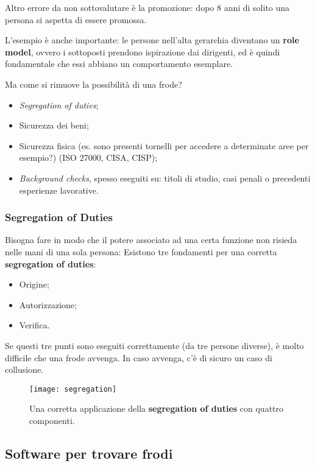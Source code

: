Altro errore da non sottovalutare è la promozione: dopo 8 anni di solito una
persona si aspetta di essere promossa.

L'esempio è anche importante: le persone nell'alta gerarchia diventano un
\textbf{role model}, ovvero i sottoposti prendono ispirazione dai dirigenti, ed
è quindi fondamentale che essi abbiano un comportamento esemplare.

Ma come si rimuove la possibilità di una frode?
\begin{itemize}
  \item \textit{Segregation of duties};
  \item Sicurezza dei beni;
  \item Sicurezza fisica (es. sono presenti tornelli per accedere a determinate
aree per esempio?) (ISO 27000, CISA, CISP);
  \item \textit{Background checks}, spesso eseguiti su: titoli di studio, 
  casi penali o precedenti esperienze lavorative.
\end{itemize}

\subsubsection{Segregation of Duties}

Bisogna fare in modo che il potere associato ad una certa funzione non risieda
nelle mani di una sola persona:
Esistono tre fondamenti per una corretta \textbf{segregation of duties}:
\begin{itemize}
  \item Origine;
  \item Autorizzazione;
  \item Verifica.
\end{itemize}

Se questi tre punti sono eseguiti correttamente (da tre persone diverse), 
è molto difficile che una frode avvenga. 
In caso avvenga, c'è di sicuro un caso di collusione.

\begin{figure}[H]
 \centering
 \texttt{[image: segregation]}
 \caption{Una corretta applicazione della \textbf{segregation of duties} con 
quattro componenti.}
\end{figure}

\subsection{Software per trovare frodi}

